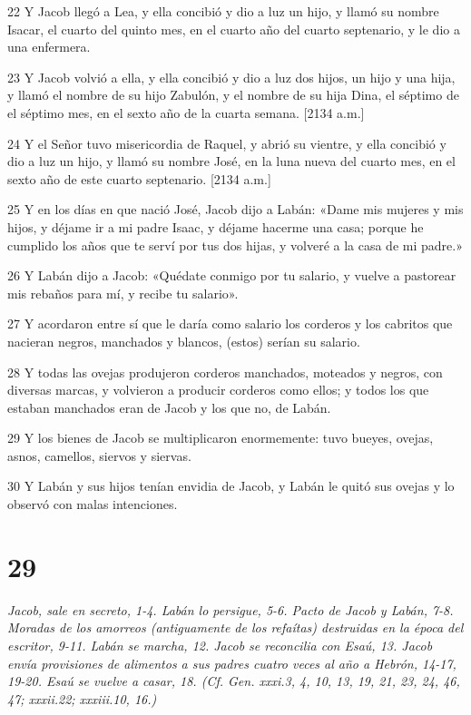 \par 22 Y Jacob llegó a Lea, y ella concibió y dio a luz un hijo, y llamó su nombre Isacar, el cuarto del quinto mes, en el cuarto año del cuarto septenario, y le dio a una enfermera.
\par 23 Y Jacob volvió a ella, y ella concibió y dio a luz dos hijos, un hijo y una hija, y llamó el nombre de su hijo Zabulón, y el nombre de su hija Dina, el séptimo de el séptimo mes, en el sexto año de la cuarta semana. [2134 a.m.]
\par 24 Y el Señor tuvo misericordia de Raquel, y abrió su vientre, y ella concibió y dio a luz un hijo, y llamó su nombre José, en la luna nueva del cuarto mes, en el sexto año de este cuarto septenario. [2134 a.m.]
\par 25 Y en los días en que nació José, Jacob dijo a Labán: «Dame mis mujeres y mis hijos, y déjame ir a mi padre Isaac, y déjame hacerme una casa; porque he cumplido los años que te serví por tus dos hijas, y volveré a la casa de mi padre.»
\par 26 Y Labán dijo a Jacob: «Quédate conmigo por tu salario, y vuelve a pastorear mis rebaños para mí, y recibe tu salario».
\par 27 Y acordaron entre sí que le daría como salario los corderos y los cabritos que nacieran negros, manchados y blancos, (estos) serían su salario.
\par 28 Y todas las ovejas produjeron corderos manchados, moteados y negros, con diversas marcas, y volvieron a producir corderos como ellos; y todos los que estaban manchados eran de Jacob y los que no, de Labán.
\par 29 Y los bienes de Jacob se multiplicaron enormemente: tuvo bueyes, ovejas, asnos, camellos, siervos y siervas.
\par 30 Y Labán y sus hijos tenían envidia de Jacob, y Labán le quitó sus ovejas y lo observó con malas intenciones.

\chapter{29}

\par \textit{Jacob, sale en secreto, 1-4. Labán lo persigue, 5-6. Pacto de Jacob y Labán, 7-8. Moradas de los amorreos (antiguamente de los refaítas) destruidas en la época del escritor, 9-11. Labán se marcha, 12. Jacob se reconcilia con Esaú, 13. Jacob envía provisiones de alimentos a sus padres cuatro veces al año a Hebrón, 14-17, 19-20. Esaú se vuelve a casar, 18. (Cf. Gen. xxxi.3, 4, 10, 13, 19, 21, 23, 24, 46, 47; xxxii.22; xxxiii.10, 16.)}

